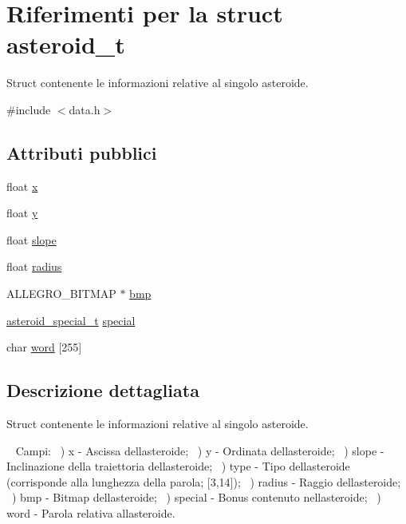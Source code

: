 \hypertarget{structasteroid__t}{}\section{Riferimenti per la struct asteroid\+\_\+t}
\label{structasteroid__t}


Struct contenente le informazioni relative al singolo asteroide.  




{\ttfamily \#include $<$data.\+h$>$}

\subsection*{Attributi pubblici}
\begin{DoxyCompactItemize}
\item 
float \hyperlink{structasteroid__t_af41593baa5b59279f5bf4d7a498826b6}{x}
\item 
float \hyperlink{structasteroid__t_a28ab3f0bb57149edc6d9833ab72ba1fe}{y}
\item 
float \hyperlink{structasteroid__t_a19bfa7c8a4113260ff94d6972a1f513e}{slope}
\item 
float \hyperlink{structasteroid__t_a3673f9f4ae4c9527ef85d1d7766c6b67}{radius}
\item 
A\+L\+L\+E\+G\+R\+O\+\_\+\+B\+I\+T\+M\+AP $\ast$ \hyperlink{structasteroid__t_a63929aa14d65a32b5b6670f658d1b422}{bmp}
\item 
\hyperlink{data_8h_a07b940e2e86eb4fc3f1e1e1843da0564}{asteroid\+\_\+special\+\_\+t} \hyperlink{structasteroid__t_aa5ca690a9e6c59f5b94ed5686842e653}{special}
\item 
char \hyperlink{structasteroid__t_aba9bbb1bf92d82b752f4804a8e1252da}{word} \mbox{[}255\mbox{]}
\end{DoxyCompactItemize}


\subsection{Descrizione dettagliata}
Struct contenente le informazioni relative al singolo asteroide. 

~\newline
Campi\+: ~) x -\/ Ascissa dell\textquotesingle{}asteroide; ~) y -\/ Ordinata dell\textquotesingle{}asteroide; ~) slope -\/ Inclinazione della traiettoria dell\textquotesingle{}asteroide; ~) type -\/ Tipo dell\textquotesingle{}asteroide (corrisponde alla lunghezza della parola; \mbox{[}3,14\mbox{]}); ~) radius -\/ Raggio dell\textquotesingle{}asteroide; ~) bmp -\/ Bitmap dell\textquotesingle{}asteroide; ~) special -\/ Bonus contenuto nell\textquotesingle{}asteroide; ~) word -\/ Parola relativa all\textquotesingle{}asteroide. 

